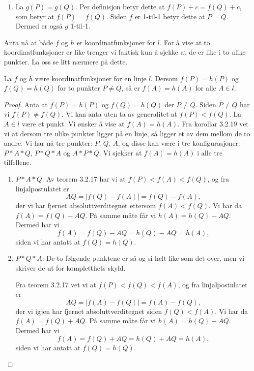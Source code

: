 \begin{oppgave}[3.2.12]
\begin{punkt}
\begin{enumerate}
        \item La $g(P)=g(Q)$. Per definisjon betyr dette at $f(P)+c=f(Q)+c$, som betyr 
        at $f(P)=f(Q)$. Siden $f$ er 1-til-1 betyr dette at $P=Q$. Dermed er også $g$
        1-til-1. 
    \end{enumerate}
  \end{punkt}

  \begin{punkt}
    Anta nå at både $f$ og $h$ er koordinatfunksjoner for $l$. For å vise at to 
    koordinatfunksjoner er like trenger vi faktisk kun å sjekke at de er like i to ulike 
    punkter. La oss se litt nærmere på dette.
    
    \begin{lemma}\label{lm:1}
      La $f$ og $h$ være koordinatfunksjoner for en linje $l$. Dersom $f(P)=h(P)$ og 
      $f(Q)=h(Q)$ for to punkter $P\neq Q$, så er $f(A)=h(A)$ for alle $A\in l$. 
    \end{lemma}

    \begin{proof}
      Anta at $f(P)=h(P)$ og $f(Q)=h(Q)$ der $P\neq Q$. Siden $P\neq Q$ har vi $f(P)\neq f(Q)$.
      Vi kan anta uten ta av generalitet at $f(P)< f(Q)$. La $A\in l$ være et punkt. Vi ønsker 
      å vise at $f(A)=h(A)$. Fra korollar 3.2.19 vet vi at dersom tre ulike punkter ligger på en
      linje, så ligger et av dem mellom de to andre. Vi har nå tre punkter: $P$, $Q$, $A$, og 
      disse kan være i tre konfigurasjoner: $P\ast A\ast Q$, $P\ast Q\ast A$ og $A\ast P\ast Q$. 
      Vi sjekker at $f(A)=h(A)$ i alle tre tilfellene. 
      \begin{enumerate}
        \item $P\ast A\ast Q$: Av teorem 3.2.17 har vi at $f(P)<f(A)<f(Q)$, og fra 
        linjalpostulatet er $$ AQ = |f(Q)-f(A)| = f(Q)-f(A), $$ der vi har fjernet 
        absoluttverditegnet ettersom $f(A)<f(Q)$. Vi har da $f(A)=f(Q)-AQ$. På samme måte får vi 
        $h(A)=h(Q)-AQ$. Dermed har vi $$ f(A)=f(Q)-AQ = h(Q)-AQ = h(A), $$ siden vi har antatt 
        at $f(Q)=h(Q)$. 
    
        \item $P\ast Q\ast A$: De to følgende punktene er så og si helt like som det over, men 
        vi skriver de ut for kompletthets skyld. 
    
        Fra teorem 3.2.17 vet vi at $f(P)<f(Q)<f(A)$, og fra linjalpostulatet er 
        $$ AQ = |f(A)-f(Q)| = f(A)-f(Q), $$ der vi igjen har fjernet absoluttverditegnet siden 
        $f(Q)<f(A)$. Vi har da $f(A)=f(Q)+AQ$. På samme måte får vi $h(A)=h(Q)+AQ$. Dermed har 
        vi $$ f(A)=f(Q)+AQ = h(Q)+AQ = h(A), $$ siden vi har antatt at $f(Q)=h(Q)$. 
    

\end{enumerate}
\end{proof}
\end{punkt}
\end{oppgave}
